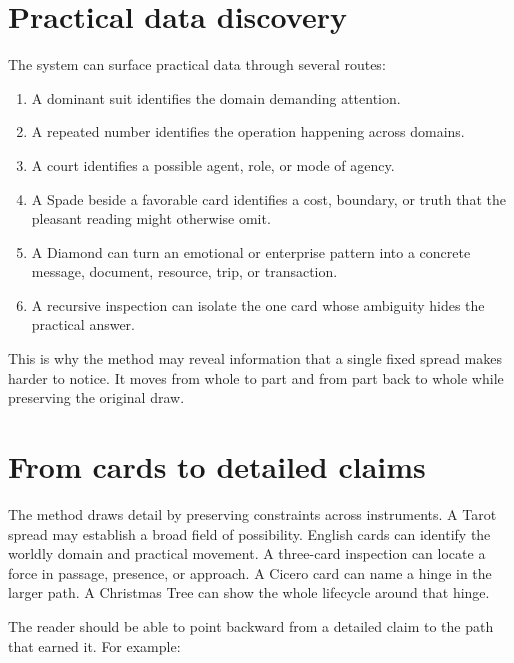 \section{Practical data discovery}

The system can surface practical data through several routes:

\begin{enumerate}
\item A dominant suit identifies the domain demanding attention.
\item A repeated number identifies the operation happening across domains.
\item A court identifies a possible agent, role, or mode of agency.
\item A Spade beside a favorable card identifies a cost, boundary, or truth that
      the pleasant reading might otherwise omit.
\item A Diamond can turn an emotional or enterprise pattern into a concrete
      message, document, resource, trip, or transaction.
\item A recursive inspection can isolate the one card whose ambiguity hides the
      practical answer.
\end{enumerate}

This is why the method may reveal information that a single fixed spread makes
harder to notice. It moves from whole to part and from part back to whole while
preserving the original draw.

\section{From cards to detailed claims}

The method draws detail by preserving constraints across instruments. A Tarot
spread may establish a broad field of possibility. English cards can identify
the worldly domain and practical movement. A three-card inspection can locate a
force in passage, presence, or approach. A Cicero card can name a hinge in the
larger path. A Christmas Tree can show the whole lifecycle around that hinge.

The reader should be able to point backward from a detailed claim to the path
that earned it. For example:

